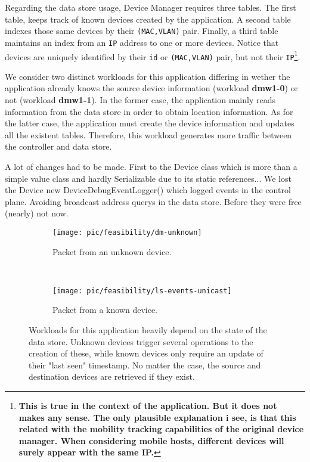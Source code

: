 Regarding the data store usage, Device Manager requires three
tables. The first table, keeps track 
of known devices created by the
application. A second table indexes those same devices by their
\texttt{(MAC,VLAN)} pair.  Finally, a third table maintains an index
from an \texttt{IP} address to one or more devices. Notice
that devices are uniquely identified by their \texttt{id} or \texttt{(MAC,VLAN)} pair, but not their \texttt{IP}\footnote{\textbf{This is true in the context of
  the application. But it does not makes any sense. The only plausible
explanation i see, is that this related with the mobility
tracking capabilities of the original device manager. When considering
mobile hosts, different devices will surely appear with the same
IP.} }.  

We consider two distinct workloads for this application differing in
wether the application already knows the source device information (workload \textbf{dmw1-0})
or not (workload \textbf{dmw1-1}). In the former case, the
application mainly reads information from the data store in order to
obtain location information. As for the latter case, the
application must create the device information and updates all the
existent tables. Therefore, this workload generates more traffic between
the controller and data store. 




A lot of changes had to be made. First to the Device class which is
more than a simple value class and hardly Serializable due to its
static references... 
We lost the Device new DeviceDebugEventLogger() which logged events in
the control plane. 
Avoiding broadcast address querys in the data store. Before they were
free (nearly) not now. 

\begin{figure}
  \centering
  \begin{subfigure}[b]{0.5\textwidth}
                \centering
                \texttt{[image: pic/feasibility/dm-unknown]}
                \caption{Packet from an unknown device.}
                \label{fig:dm:interaction:unknown}
        \end{subfigure}%
        ~
        \begin{subfigure}[b]{0.5\textwidth}
                \centering
                \texttt{[image: pic/feasibility/ls-events-unicast]}
                \caption{Packet from a known device.}
                \label{fig:dm:interaction:known}
        \end{subfigure}
        \caption[Device Manager workload events]{Workloads for this application heavily depend on the state of the data store. Unknown devices trigger several operations to the creation of these, while known devices only require an update of their "last seen" timestamp. No matter the case, the source and destination devices are retrieved if they exist.}
        \label{fig:dm:interaction}
\end{figure}


